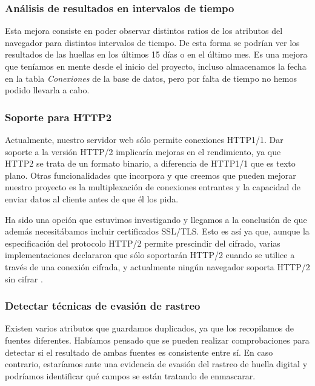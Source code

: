 \subsubsection{Análisis de resultados en intervalos de tiempo}
Esta mejora consiste en poder observar distintos ratios de los atributos del navegador para distintos intervalos de tiempo. De esta forma se podrían ver los resultados de las huellas en los últimos 15 días o en el último mes. Es una mejora que teníamos en mente desde el inicio del proyecto, incluso almacenamos la fecha en la tabla \textit{Conexiones} de la base de datos, pero por falta de tiempo no hemos podido llevarla a cabo.
\subsubsection{Soporte para HTTP2}
Actualmente, nuestro servidor web sólo permite conexiones HTTP1/1. Dar soporte a la versión HTTP/2 implicaría mejoras en el rendimiento, ya que HTTP2 se trata de un formato binario, a diferencia de HTTP1/1 que es texto plano. Otras funcionalidades que incorpora y que creemos que pueden mejorar nuestro proyecto es la multiplexación de conexiones entrantes y la capacidad de enviar datos al cliente antes de que él los pida. \par
Ha sido una opción que estuvimos investigando y llegamos a la conclusión de que además necesitábamos incluir certificados SSL/TLS. Esto es así ya que, aunque la especificación del protocolo HTTP/2 permite prescindir del cifrado, varias implementaciones declararon que sólo soportarán HTTP/2 cuando se utilice a través de una conexión cifrada, y actualmente ningún navegador soporta HTTP/2 sin cifrar \cite{http2}. \par
\subsubsection{Detectar técnicas de evasión de rastreo}
Existen varios atributos que guardamos duplicados, ya que los recopilamos de fuentes diferentes. Habíamos pensado que se pueden realizar comprobaciones para detectar si el resultado de ambas fuentes es consistente entre sí. En caso contrario, estaríamos ante una evidencia de evasión del rastreo de huella digital y podríamos identificar qué campos se están tratando de enmascarar.
\noindent
